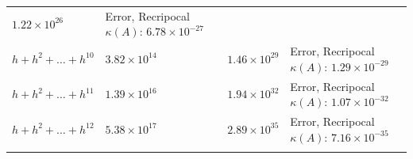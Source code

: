 \documentclass[
]{article}
\begin{document}
\begin{longtable}[]{@{}llll@{}}
\begin{minipage}[t]{0.16\columnwidth}
\(1.22 \times 10^{26}\)\strut
\end{minipage} & \begin{minipage}[t]{0.40\columnwidth}\raggedright
Error, Recripocal \(\kappa(A)\): \(6.78 \times 10^{-27}\)\strut
\end{minipage}\tabularnewline
\begin{minipage}[t]{0.17\columnwidth}\raggedright
\(h+h^{2}+\dots+h^{10}\)\strut
\end{minipage} & \begin{minipage}[t]{0.16\columnwidth}\raggedright
\(3.82 \times 10^{14}\)\strut
\end{minipage} & \begin{minipage}[t]{0.16\columnwidth}\raggedright
\(1.46 \times 10^{29}\)\strut
\end{minipage} & \begin{minipage}[t]{0.40\columnwidth}\raggedright
Error, Recripocal \(\kappa(A)\): \(1.29 \times 10^{-29}\)\strut
\end{minipage}\tabularnewline
\begin{minipage}[t]{0.17\columnwidth}\raggedright
\(h+h^{2}+\dots+h^{11}\)\strut
\end{minipage} & \begin{minipage}[t]{0.16\columnwidth}\raggedright
\(1.39 \times 10^{16}\)\strut
\end{minipage} & \begin{minipage}[t]{0.16\columnwidth}\raggedright
\(1.94 \times 10^{32}\)\strut
\end{minipage} & \begin{minipage}[t]{0.40\columnwidth}\raggedright
Error, Recripocal \(\kappa(A)\): \(1.07 \times 10^{-32}\)\strut
\end{minipage}\tabularnewline
\begin{minipage}[t]{0.17\columnwidth}\raggedright
\(h+h^{2}+\dots+h^{12}\)\strut
\end{minipage} & \begin{minipage}[t]{0.16\columnwidth}\raggedright
\(5.38 \times 10^{17}\)\strut
\end{minipage} & \begin{minipage}[t]{0.16\columnwidth}\raggedright
\(2.89 \times 10^{35}\)\strut
\end{minipage} & \begin{minipage}[t]{0.40\columnwidth}\raggedright
Error, Recripocal \(\kappa(A)\): \(7.16 \times 10^{-35}\)\strut
\end{minipage}\tabularnewline
\begin{minipage}[t]{0.17\columnwidth}\raggedright

\end{minipage}
\end{longtable}
\end{document}
